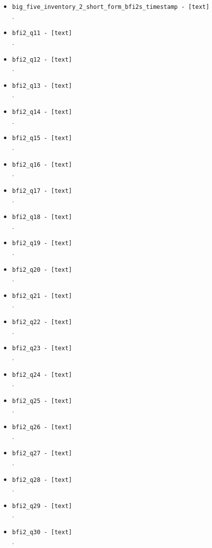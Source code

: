 \begin{description}
\begin{addmargin}[0em]{0em}
\begin{addmargin}[1em]{0em}
\begin{itemize}
            \item \verb|big_five_inventory_2_short_form_bfi2s_timestamp - [text]|\\.
            \item \verb|bfi2_q11 - [text]|\\.
            \item \verb|bfi2_q12 - [text]|\\.
            \item \verb|bfi2_q13 - [text]|\\.
            \item \verb|bfi2_q14 - [text]|\\.
            \item \verb|bfi2_q15 - [text]|\\.
            \item \verb|bfi2_q16 - [text]|\\.
            \item \verb|bfi2_q17 - [text]|\\.
            \item \verb|bfi2_q18 - [text]|\\.
            \item \verb|bfi2_q19 - [text]|\\.
            \item \verb|bfi2_q20 - [text]|\\.
            \item \verb|bfi2_q21 - [text]|\\.
            \item \verb|bfi2_q22 - [text]|\\.
            \item \verb|bfi2_q23 - [text]|\\.
            \item \verb|bfi2_q24 - [text]|\\.
            \item \verb|bfi2_q25 - [text]|\\.
            \item \verb|bfi2_q26 - [text]|\\.
            \item \verb|bfi2_q27 - [text]|\\.
            \item \verb|bfi2_q28 - [text]|\\.
            \item \verb|bfi2_q29 - [text]|\\.
            \item \verb|bfi2_q30 - [text]|\\.

\end{itemize}
\end{addmargin}
\end{addmargin}
\end{description}
